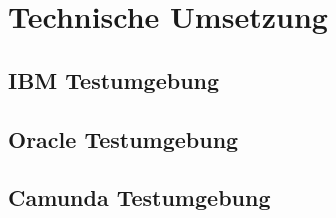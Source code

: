 
\section{Technische Umsetzung}


\subsection{IBM Testumgebung}


\subsection{Oracle Testumgebung}


\subsection{Camunda Testumgebung}


